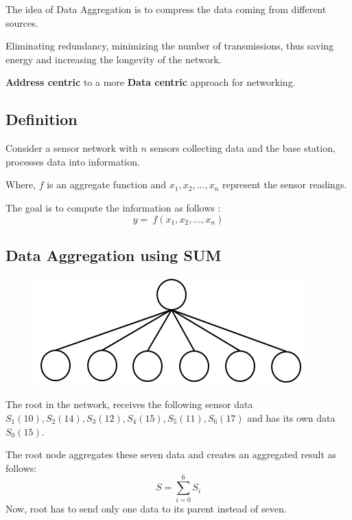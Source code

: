\documentclass[%
  slidesonly,%
  semlayer%
  ]{seminar}                                  %
\begin{document}
\begin{slide}
  The idea of Data Aggregation is to compress the data coming from different sources.

  \vspace{0.3in}

  Eliminating redundancy, minimizing the number of transmissions, thus saving energy and increasing the longevity of the network.

  \vspace{0.3in}

  \textbf{Address centric} to a more \textbf{Data centric} approach for networking.
  \vfill
  \clearpage

  \subsection*{Definition}
      \vspace{0.3in}
      Consider a sensor network with $n$ sensors collecting data and the base station, processes data into information. 

      Where, $f$ is an aggregate function and $x_{1}, x_{2},..., x_{n}$ represent the sensor readings.

      The goal is to compute the information as follows :
      \begin{equation*}
        y =\ f(x_{1}, x_{2},...,x_{n})
      \end{equation*}
      \vfill
      \clearpage

  \subsection*{Data Aggregation using SUM}
    \vfill      
    \begin{figure}
      \centering
      \includegraphics[scale = 0.4]{images/star-tree.png}
    \end{figure}

    The root in the network, receives the following sensor data $S_{1}(10), S_{2}(14), S_{3}(12), S_{4}(15), S_{5}(11),S_{6}(17)$ and has its own data $S_{0}(15)$. 

    The root node aggregates these seven data and creates an aggregated result as follows:
    \begin{equation}
      S = \sum_{i=0}^6 S_{i}
    \end{equation}
    Now, root has to send only one data to its parent instead of seven.
    \vfill
    \clearpage


\end{slide}
\end{document}
